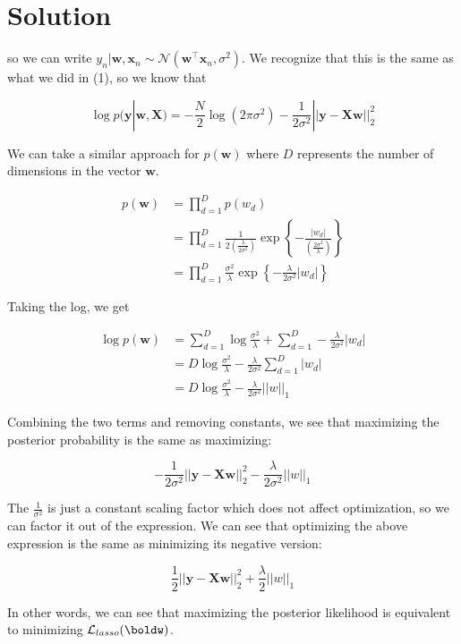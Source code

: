 \documentclass[submit]{../harvardml}
\newenvironment{solution}
  {\color{blue}\section*{Solution}}
{}
\begin{document}
\begin{solution}
\begin{enumerate}
        so we can write $y_n | \bm w, \bm x_n \sim \mathcal{N}(\bm w^\top \bm x_n, \sigma^2)$. We recognize that this is the same as what we did in (1), so we know that

        \[
        \log  p(\bm y|\bm w, \bm X) 
            = -\frac{N}{2}\log(2\pi\sigma^2)-\frac{1}{2\sigma^2}||\bm y-\bm X \bm w||^2_2
        \]

        We can take a similar approach for $p(\bm w)$ where $D$ represents the number of dimensions in the vector $\bm w$.

        \begin{align*}
            p(\bm w) &= \prod_{d=1}^{D} p(w_d) \\
            &= \prod_{d=1}^{D} \frac{1}{2\left(\frac{\lambda}{2\sigma^2}\right)}\exp\left\{-\frac{|w_d|}{\left(\frac{2\sigma^2}{\lambda}\right)}\right\} \\
            &= \prod_{d=1}^{D} \frac{\sigma^2}{\lambda}\exp\left\{-\frac{\lambda}{2\sigma^2}|w_d|\right\}
        \end{align*}

        Taking the log, we get

        \begin{align*}
            \log p(\bm w) &= \sum_{d=1}^{D} \log \frac{\sigma^2}{\lambda}+ \sum_{d=1}^{D}-\frac{\lambda}{2\sigma^2}|w_d| \\
            &= D\log \frac{\sigma^2}{\lambda} - \frac{\lambda}{2\sigma^2} \sum_{d=1}^D |w_d|\\
            &= D\log \frac{\sigma^2}{\lambda} - \frac{\lambda}{2\sigma^2}||w||_1
        \end{align*}

        Combining the two terms and removing constants, we see that maximizing the posterior probability is the same as maximizing:

        \[
        -\frac{1}{2\sigma^2}||\bm y-\bm X \bm w||^2_2- \frac{\lambda}{2\sigma^2}||w||_1
        \]

        The $\frac{1}{\sigma^2}$ is just a constant scaling factor which does not affect optimization, so we can factor it out of the expression. We can see that optimizing the above expression is the same as minimizing its negative version:

        \[
        \frac{1}{2}||\bm y-\bm X \bm w||^2_2+ \frac{\lambda}{2}||w||_1
        \]

        In other words, we can see that maximizing the posterior likelihood is equivalent to minimizing $\mathcal{L}_{lasso}(\boldw)$.
        

\end{enumerate}
\end{solution}
\end{document}
